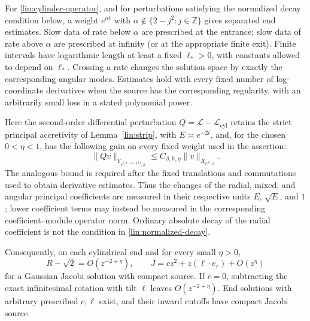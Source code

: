 \begin{lemma}\label{lin:rates}
For \eqref{lin:cylinder-operator}, and for perturbations satisfying
the normalized decay condition below, a weight $e^{\alpha t}$
with $\alpha\notin\{2-j^2:j\in\mathbb Z\}$ gives separated end
estimates.  Slow data of rate below $\alpha$ are prescribed at the
entrance; slow data of rate above $\alpha$ are prescribed at infinity
(or at the appropriate finite exit).  Finite intervals have logarithmic
length at least a fixed $\ell_*>0$, with constants allowed to depend
on $\ell_*$.  Crossing a rate changes the
solution space by exactly the corresponding angular modes.  Estimates
hold with every fixed number of log-coordinate derivatives when the
source has the corresponding regularity, with an arbitrarily small
loss in a stated polynomial power.

Here the second-order differential perturbation
$Q=\mathcal L-\mathcal L_{\mathrm{cyl}}$ retains
the strict principal accretivity of Lemma~\ref{lin:strip}, with
$E\asymp e^{-2t}$, and, for the chosen $0<\eta<1$, has the following gain on every fixed weight
used in the assertion:
\begin{equation}\label{lin:normalized-decay}
 \|Qv\|_{Y_{e^{(\beta-2+\eta)t},h}}
       \le C_{\beta,h,\eta}\|v\|_{X_{e^{\beta t},h}}.
\end{equation}
The analogous bound is required after the fixed translations and
commutations used to obtain derivative estimates.  Thus the changes
of the radial, mixed, and angular principal coefficients are measured
in their respective units $E$, $\sqrt E$, and $1$; lower coefficient
terms may instead be measured in the corresponding coefficient--module
operator norm.  Ordinary absolute decay of the radial coefficient is
not the condition in \eqref{lin:normalized-decay}.

Consequently, on each cylindrical end and for every small $\eta>0$,
\begin{equation}\label{lin:end-expansion}
 R-\sqrt2=O(z^{-2+\eta}),\qquad
 J=c z^2+z(\ell\cdot e_r)+O(z^\eta)
\end{equation}
for a Gaussian Jacobi solution with compact source.  If $c=0$,
subtracting the exact infinitesimal rotation with tilt $\ell$ leaves
$O(z^{-2+\eta})$.  End solutions with arbitrary prescribed $c,\ell$
exist, and their inward cutoffs have compact Jacobi source.
\end{lemma}

